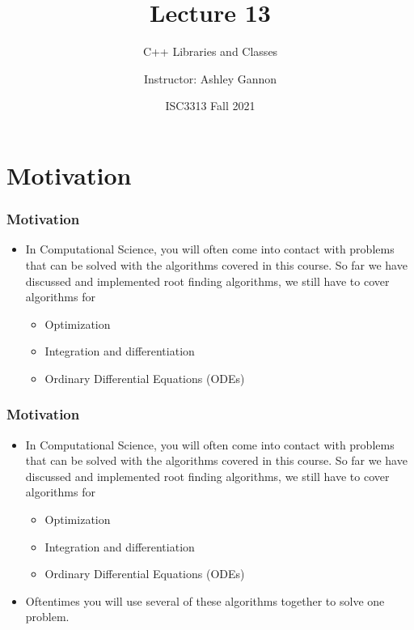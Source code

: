 \documentclass{if-beamer}
\title[Lecture 13]{Lecture 13}
\subtitle{C++ Libraries and Classes}
\author{Instructor: Ashley Gannon}
\date{ISC3313 Fall 2021}
\begin{document}
\begin{frame}
  \titlepage
\end{frame}
\section{Motivation}

\begin{frame}
\frametitle{Motivation}
\begin{itemize}
	\item In Computational Science, you will often come into contact with problems that can be solved with the algorithms covered in this course. So far we have discussed and implemented root finding algorithms, we still have to cover algorithms for\\\vspace{0.2cm}
	\begin{itemize}
		\item Optimization
		\item Integration and differentiation
		\item Ordinary Differential Equations (ODEs) \\\vspace{0.2cm}
	\end{itemize}	

\end{itemize}
\end{frame}

\begin{frame}
	\frametitle{Motivation}
	\begin{itemize}
		\item In Computational Science, you will often come into contact with problems that can be solved with the algorithms covered in this course. So far we have discussed and implemented root finding algorithms, we still have to cover algorithms for \\\vspace{0.2cm}
		\begin{itemize}
			\item Optimization
			\item Integration and differentiation
			\item Ordinary Differential Equations (ODEs) \\\vspace{0.2cm}
		\end{itemize}	
		\item Oftentimes you will use several of these algorithms together to solve one problem. \\\vspace{0.2cm}

	\end{itemize}
\end{frame}
\end{document}
